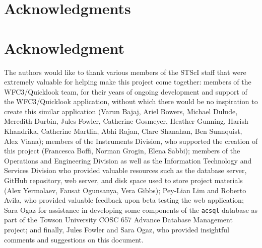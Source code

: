 \documentclass[10pt,journal,compsoc]{IEEEtran}
\begin{document}
\ifCLASSOPTIONcompsoc
  \section*{Acknowledgments}
\else
  \section*{Acknowledgment}
\fi
  The authors would like to thank various members of the STScI staff that were extremely valuable for helping make this project come together: members of the WFC3/Quicklook team, for their years of
  ongoing development and support of the WFC3/Quicklook application, without which there would be no inspiration to create this similar application (Varun Bajaj, Ariel Bowers, Michael Dulude,
  Meredith Durbin, Jules Fowler, Catherine Gosmeyer, Heather Gunning, Harish Khandrika, Catherine Martlin, Abhi Rajan, Clare Shanahan, Ben Sunnquist, Alex Viana); members of the Instruments Division,
  who supported the creation of this project (Francesca Boffi, Norman Grogin, Elena Sabbi); members of the Operations and Engineering Division as well as the Information Technology and Services
  Division who provided valuable resources such as the database server, GitHub repository, web server, and disk space used to store project materials (Alex Yermolaev, Fausat Ogunsanya, Vera Gibbs);
  Pey-Lian Lim and Roberto Avila, who provided valuable feedback upon beta testing the web application; Sara Ogaz for assistance in developing some components of the \texttt{acsql} database as part
  of the Towson University COSC 657 Advance Database Management project; and finally, Jules Fowler and Sara Ogaz, who provided insightful comments and suggestions on this document.


\ifCLASSOPTIONcaptionsoff
  \newpage
\fi
\end{document}
